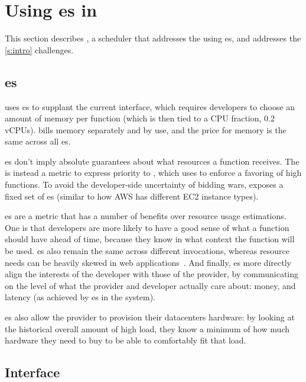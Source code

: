 \section{Using \priceclass{}es in \Sys}\label{design}

This section describes \sys{}, a scheduler that addresses the \problem{} using
\priceclass{}es, and addresses the \autoref{s:intro} challenges.

\subsection{\Priceclass{}es}

\Sys{} uses \class{}es to supplant the current interface, which requires
developers to choose an amount of memory per function (which is then tied to a
CPU fraction, \eg{} 0.2 vCPUs).  \Sys{} bills memory separately and by use, and
the price for memory is the same across all \class{}es.

\Priceclass{}es don't imply absolute guarantees about what resources a function
receives.  The \priceclass{} is instead a metric to express priority to \sys{},
which \sys{} uses to enforce a favoring of high \class{} functions.  To avoid
the developer-side uncertainty of bidding wars, \sys{} exposes a fixed set of
\priceclass{}es (similar to how AWS has different EC2 instance types).

\Priceclass{}es are a metric that has a number of benefits over resource usage
estimations. One is that developers are more likely to have a good sense of what
\priceclass{} a function should have ahead of time, because they know in what
context the function will be used. \Priceclass{}es also remain the same across
different invocations, whereas resource needs can be heavily skewed in web
applications~\cite{hermod,serverless-in-the-wild}. And finally, \class{}es more
directly align the interests of the developer with those of the provider, by
communicating on the level of what the provider and developer actually care
about: money, and latency (as achieved by \class{}es in the system).

\Priceclass{}es also allow the provider to provision their datacenters hardware:
by looking at the historical overall amount of high \priceclass{} load, they
know a minimum of how much hardware they need to buy to be able to comfortably
fit that load.

\subsection{Interface}

